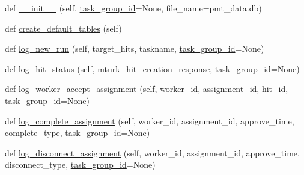 \begin{DoxyCompactItemize}
\item 
def \hyperlink{classparlai_1_1mturk_1_1core_1_1legacy__2018_1_1mturk__data__handler_1_1MTurkDataHandler_a29c63ed977f51176d78bffe42f5d21fe}{\+\_\+\+\_\+init\+\_\+\+\_\+} (self, \hyperlink{classparlai_1_1mturk_1_1core_1_1legacy__2018_1_1mturk__data__handler_1_1MTurkDataHandler_ab743471dc641c785f93d9c1285967162}{task\+\_\+group\+\_\+id}=None, file\+\_\+name=\textquotesingle{}pmt\+\_\+data.\+db\textquotesingle{})
\item 
def \hyperlink{classparlai_1_1mturk_1_1core_1_1legacy__2018_1_1mturk__data__handler_1_1MTurkDataHandler_ab2c424e19bb6a0cb664de78869df362a}{create\+\_\+default\+\_\+tables} (self)
\item 
def \hyperlink{classparlai_1_1mturk_1_1core_1_1legacy__2018_1_1mturk__data__handler_1_1MTurkDataHandler_a0bc9f338e92aa4c1dc7a0f09e743b01e}{log\+\_\+new\+\_\+run} (self, target\+\_\+hits, taskname, \hyperlink{classparlai_1_1mturk_1_1core_1_1legacy__2018_1_1mturk__data__handler_1_1MTurkDataHandler_ab743471dc641c785f93d9c1285967162}{task\+\_\+group\+\_\+id}=None)
\item 
def \hyperlink{classparlai_1_1mturk_1_1core_1_1legacy__2018_1_1mturk__data__handler_1_1MTurkDataHandler_a1b7db2687208e1af513fa590a6380779}{log\+\_\+hit\+\_\+status} (self, mturk\+\_\+hit\+\_\+creation\+\_\+response, \hyperlink{classparlai_1_1mturk_1_1core_1_1legacy__2018_1_1mturk__data__handler_1_1MTurkDataHandler_ab743471dc641c785f93d9c1285967162}{task\+\_\+group\+\_\+id}=None)
\item 
def \hyperlink{classparlai_1_1mturk_1_1core_1_1legacy__2018_1_1mturk__data__handler_1_1MTurkDataHandler_ac38ddedd0a8efa4e833a502e8d2860c6}{log\+\_\+worker\+\_\+accept\+\_\+assignment} (self, worker\+\_\+id, assignment\+\_\+id, hit\+\_\+id, \hyperlink{classparlai_1_1mturk_1_1core_1_1legacy__2018_1_1mturk__data__handler_1_1MTurkDataHandler_ab743471dc641c785f93d9c1285967162}{task\+\_\+group\+\_\+id}=None)
\item 
def \hyperlink{classparlai_1_1mturk_1_1core_1_1legacy__2018_1_1mturk__data__handler_1_1MTurkDataHandler_af086a3896a105801c66195efc8f95c03}{log\+\_\+complete\+\_\+assignment} (self, worker\+\_\+id, assignment\+\_\+id, approve\+\_\+time, complete\+\_\+type, \hyperlink{classparlai_1_1mturk_1_1core_1_1legacy__2018_1_1mturk__data__handler_1_1MTurkDataHandler_ab743471dc641c785f93d9c1285967162}{task\+\_\+group\+\_\+id}=None)
\item 
def \hyperlink{classparlai_1_1mturk_1_1core_1_1legacy__2018_1_1mturk__data__handler_1_1MTurkDataHandler_a79e0ff8d37c8df05b532a38f6eddb1e5}{log\+\_\+disconnect\+\_\+assignment} (self, worker\+\_\+id, assignment\+\_\+id, approve\+\_\+time, disconnect\+\_\+type, \hyperlink{classparlai_1_1mturk_1_1core_1_1legacy__2018_1_1mturk__data__handler_1_1MTurkDataHandler_ab743471dc641c785f93d9c1285967162}{task\+\_\+group\+\_\+id}=None)

\end{DoxyCompactItemize}
